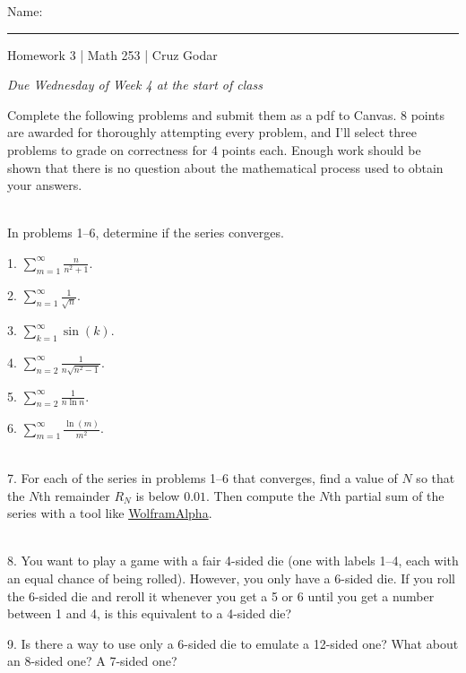 \documentclass{article}
\begin{document}
\Large Name: \rule{2in}{0.15mm} \hfill Homework 3 | Math 253 | Cruz Godar \vspace{4pt}  \normalsize

\textit{Due Wednesday of Week 4 at the start of class}

Complete the following problems and submit them as a pdf to Canvas. 8 points are awarded for thoroughly attempting every problem, and I'll select three problems to grade on correctness for 4 points each. Enough work should be shown that there is no question about the mathematical process used to obtain your answers.

~\\

In problems 1--6, determine if the series converges.

1. $\displaystyle \sum_{m = 1}^\infty \frac{n}{n^2 + 1}$.

2. $\displaystyle \sum_{n = 1}^\infty \frac{1}{\sqrt{n}}$.

3. $\displaystyle \sum_{k = 1}^\infty \sin(k)$.

4. $\displaystyle \sum_{n = 2}^\infty \frac{1}{n \sqrt{n^2 - 1}}$.

5. $\displaystyle \sum_{n = 2}^\infty \frac{1}{n\ln{n}}$.

6. $\displaystyle \sum_{m = 1}^\infty \frac{\ln(m)}{m^2}$.

~\\

7. For each of the series in problems 1--6 that converges, find a value of $N$ so that the $N$th remainder $R_N$ is below $0.01$. Then compute the $N$th partial sum of the series with a tool like \href{https://wolframalpha.com}{WolframAlpha}.

~\\

8. You want to play a game with a fair 4-sided die (one with labels 1--4, each with an equal chance of being rolled). However, you only have a 6-sided die. If you roll the 6-sided die and reroll it whenever you get a 5 or 6 until you get a number between 1 and 4, is this equivalent to a 4-sided die?

9. Is there a way to use only a 6-sided die to emulate a 12-sided one? What about an 8-sided one? A 7-sided one?
\end{document}
